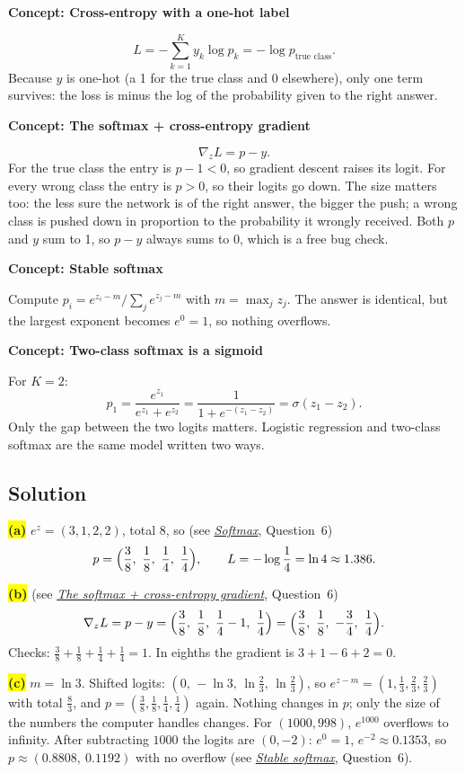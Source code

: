 \documentclass[12pt,a4paper]{article}
\newcommand{\concept}[2]{\par\medskip\phantomsection\label{#1}{\large\bfseries\color{blue!50!black} Concept: #2}\par}
\newcommand{\seeconcept}[3]{(see \hyperref[#1]{\textit{#2}}, Question~#3)}
\newcommand{\hlq}[1]{{\setlength{\fboxsep}{1.5pt}\colorbox{yellow}{#1}}}
\begin{document}
\concept{c:ce}{Cross-entropy with a one-hot label}
\[
L=-\sum_{k=1}^K y_k\log p_k=-\log p_{\text{true class}} .
\]
Because $y$ is one-hot (a 1 for the true class and 0 elsewhere), only one term survives: the loss is minus the log of the probability given to the right answer.

\concept{c:pminusy}{The softmax + cross-entropy gradient}
\[
\nabla_zL=p-y .
\]
For the true class the entry is $p-1<0$, so gradient descent raises its logit. For every wrong class the entry is $p>0$, so their logits go down. The size matters too: the less sure the network is of the right answer, the bigger the push; a wrong class is pushed down in proportion to the probability it wrongly received. Both $p$ and $y$ sum to 1, so $p-y$ always sums to 0, which is a free bug check.

\concept{c:stablesoftmax}{Stable softmax}
Compute $p_i=e^{z_i-m}/\sum_je^{z_j-m}$ with $m=\max_jz_j$. The answer is identical, but the largest exponent becomes $e^0=1$, so nothing overflows.

\concept{c:twoclass}{Two-class softmax is a sigmoid}
For $K=2$:
\[
p_1=\frac{e^{z_1}}{e^{z_1}+e^{z_2}}=\frac{1}{1+e^{-(z_1-z_2)}}=\sigma(z_1-z_2).
\]
Only the gap between the two logits matters. Logistic regression and two-class softmax are the same model written two ways.

\subsection*{Solution}
\hlq{\textbf{(a)}} $e^z=(3,1,2,2)$, total $8$, so \seeconcept{c:softmax}{Softmax}{6}
\[
p=\Bigl(\frac38,\ \frac18,\ \frac14,\ \frac14\Bigr),\qquad L=-\log\frac14=\ln4\approx1.386 .
\]

\hlq{\textbf{(b)}} \seeconcept{c:pminusy}{The softmax + cross-entropy gradient}{6}
\[
\nabla_zL=p-y=\Bigl(\frac38,\ \frac18,\ \frac14-1,\ \frac14\Bigr)=\Bigl(\frac38,\ \frac18,\ -\frac34,\ \frac14\Bigr).
\]
Checks: $\tfrac38+\tfrac18+\tfrac14+\tfrac14=1$. In eighths the gradient is $3+1-6+2=0$.

\hlq{\textbf{(c)}} $m=\ln3$. Shifted logits: $(0,\,-\ln3,\,\ln\tfrac23,\,\ln\tfrac23)$, so $e^{z-m}=(1,\tfrac13,\tfrac23,\tfrac23)$ with total $\tfrac83$, and $p=(\tfrac38,\tfrac18,\tfrac14,\tfrac14)$ again. Nothing changes in $p$; only the size of the numbers the computer handles changes. For $(1000,998)$, $e^{1000}$ overflows to infinity. After subtracting $1000$ the logits are $(0,-2)$: $e^0=1$, $e^{-2}\approx0.1353$, so $p\approx(0.8808,\ 0.1192)$ with no overflow \seeconcept{c:stablesoftmax}{Stable softmax}{6}.
\end{document}
